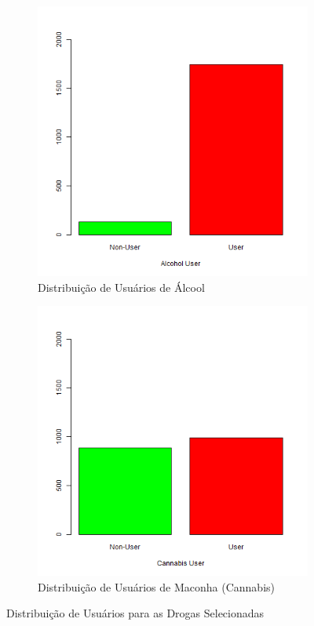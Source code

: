 \documentclass[
	article,			%
	11pt,				%
	oneside,			%
	a4paper,			%
	english,			%
	brazil,				%
	sumario=tradicional
	]{abntex2}
\begin{document}
\begin{figure}[H]
\centering
\begin{subfigure}{.5\textwidth}
  \centering
  \includegraphics[width=\linewidth]{figuras/dist_user_alcohol.png}
  \caption{Distribuição de Usuários de Álcool}
  \label{distalc}
\end{subfigure}%
\begin{subfigure}{.5\textwidth}
  \centering
  \includegraphics[width=\linewidth]{figuras/dist_user_cannabis.png}
  \caption{Distribuição de Usuários de Maconha (Cannabis)}
  \label{distcan}
\end{subfigure}
\caption{Distribuição de Usuários para as Drogas Selecionadas}
\label{user1}
\end{figure}
\end{document}

